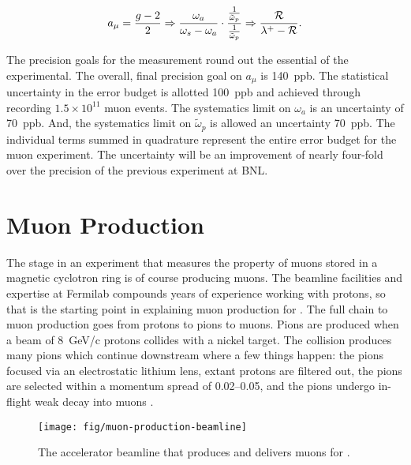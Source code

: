 \begin{equation}
\label{eqn:a-mu-precession-1}
a_\mu = \frac{g - 2}{2} \\
\Rightarrow \frac{\omega_a}{\omega_s - \omega_a} \cdot \\
\frac{\frac{1}{\tilde{\omega}_p}}{\frac{1}{\tilde{\omega}_p}} \\
\Rightarrow \frac{\mathcal{R}}{\lambda^+ - \mathcal{R}}.
\end{equation}

The precision goals for the measurement round out the essential of the experimental.  The overall, final precision goal on $a_\mu$ is \SI{140}{ppb}.  The statistical uncertainty in the error budget is allotted \SI{100}{ppb} and achieved through recording $1.5\times10^{11}$ muon events.  The systematics limit on $\omega_a$ is an uncertainty of \SI{70}{ppb}.  And, the systematics limit on $\tilde{\omega}_p$ is allowed an uncertainty \SI{70}{ppb}.  The individual terms summed in quadrature represent the entire error budget for the muon \gmtwo experiment.  The uncertainty will be an improvement of nearly four-fold over the precision of the previous experiment at BNL.

\section{Muon Production} \label{sec:muon-production}

The stage in an experiment that measures the property of muons stored in a magnetic cyclotron ring is of course producing muons.  The beamline facilities and expertise at Fermilab compounds years of experience working with protons, so that is the starting point in explaining muon production for \gmtwo.  The full chain to muon production goes from protons to pions to muons.  Pions are produced when a beam of \SI{8}{\GeV/c} protons collides with a nickel target.  The collision produces many pions which continue downstream where a few things happen: the pions focused via an electrostatic lithium lens, extant protons are filtered out, the pions are selected within a momentum spread of \SIrange{0.02}{0.05}{}, and the pions undergo in-flight weak decay into muons \cite{e989-tdr}.

\begin{figure}
\label{fig:muon-production-beamline}
\texttt{[image: fig/muon-production-beamline]}
\caption{The accelerator beamline that produces and delivers muons for \gmtwo. }
\end{figure}

